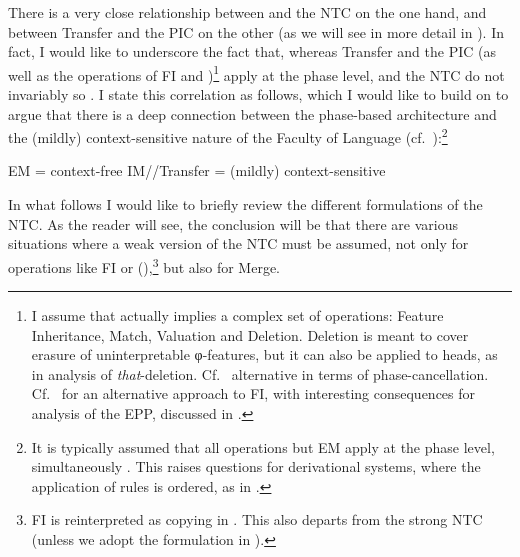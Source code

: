 \documentclass[output=paper]{langsci/langscibook}
\begin{document}
There is a very close relationship between  and the \gls{NTC} on the one
hand, and between Transfer and the \gls{PIC} on the other (as we will
see in more detail in ). In fact, I would like to underscore the fact
that, whereas Transfer and the \gls{PIC} (as well as the operations of \gls{FI}
and )\footnote{I assume that  actually implies a complex set of
    operations: Feature Inheritance, Match, Valuation and Deletion. Deletion is
    meant to cover erasure of uninterpretable φ-features, but it can also be
    applied to heads, as in  analysis of
    \emph{that}-deletion.  Cf.~\citet{EKS2016} alternative in terms of
    phase-cancellation. Cf.~\citet{Gallego2014} for an alternative approach to
\gls{FI}, with interesting consequences for   analysis of
the \gls{EPP}, discussed in \citet{Gallego2017}.} apply at the
phase level,  and the \gls{NTC} do not invariably so
\parencites[17]{Chomsky2007}[143]{Chomsky2008}[40, 42]{Chomsky2013}. I state
this correlation as follows, which I would like to build on to argue that there
is a deep connection between the phase-based architecture and the (mildly)
context-sensitive nature of the Faculty of Language
(cf.~\citealt{Chomsky1956,Uriagereka2008}):\footnote{It is typically assumed
    that all operations but \gls{EM} apply at the phase level,
    simultaneously
    \parencites[116]{Chomsky2004}[19]{Chomsky2005}[17]{Chomsky2007}[155]{Chomsky2008}.
    This raises questions for derivational systems, where the application of
rules is ordered, as in \citet{Chomsky2015}.}

\ea%
    \label{ex:34.3}
    \ea \gls{EM} = context-free
    \ex {}\gls{IM}\slash {}\slash Transfer = (mildly) context-sensitive
    \z
\z

In what follows I would like to briefly review the different formulations of
the \gls{NTC}. As the reader will see, the conclusion will be that there are
various situations where a weak version of the \gls{NTC} must be assumed, not only for operations like \gls{FI} or
 (\citealt[19, fn.\ 26]{Chomsky2007}),\footnote{\gls{FI} is
    reinterpreted as copying in \citet[47]{Chomsky2013}. This also departs from
    the strong \gls{NTC} (unless we adopt the
formulation in \citealt{Gallego2014}).\label{fn:34.8}} but also for Merge.
\end{document}
